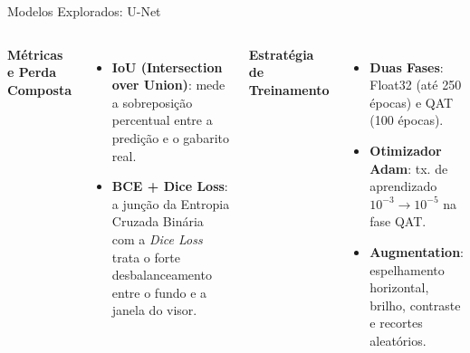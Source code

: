 \documentclass[
    aspectratio=169,
    12pt,
    brazil
]{beamer}
\begin{document}
\begin{frame}{Modelos Explorados: U-Net}
  \begin{columns}[t]
    {\small\bfseries\color{senacblue}Métricas e Perda Composta}
    \begin{itemize}\small
      \item \textbf{IoU (Intersection over Union)}: mede a sobreposição percentual entre a predição e o gabarito real.
      \item \textbf{BCE + Dice Loss}: a junção da Entropia Cruzada Binária com a \textit{Dice Loss} trata o forte desbalanceamento entre o fundo e a janela do visor.
    \end{itemize}

    {\small\bfseries\color{senacblue}Estratégia de Treinamento}
    \begin{itemize}\small
      \item \textbf{Duas Fases}: Float32 (até 250 épocas) e QAT (100 épocas).
      \item \textbf{Otimizador Adam}: tx. de aprendizado $10^{-3} \rightarrow 10^{-5}$ na fase QAT.
      \item \textbf{Augmentation}: espelhamento horizontal, brilho, contraste e recortes aleatórios.
    \end{itemize}
  \end{columns}

  \vspace{0.4cm}
  \centering
\end{frame}
\end{document}
